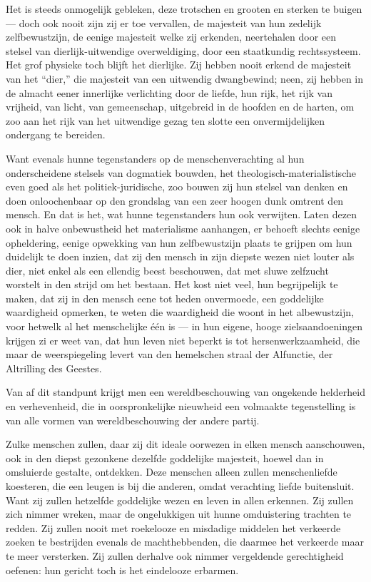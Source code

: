 \documentclass[a4paper, 12pt, oneside, dutch]{article}
\begin{document}
Het is steeds onmogelijk gebleken, deze trotschen en grooten en sterken te buigen --- doch ook nooit zijn zij er toe vervallen, de majesteit van hun zedelijk zelfbewustzijn, de eenige majesteit welke zij erkenden, neertehalen door een stelsel van dierlijk-uitwendige overweldiging, door een staatkundig rechtssysteem. Het grof physieke toch blijft het dierlijke. Zij hebben nooit erkend de majesteit van het "`dier,"' die majesteit van een uitwendig dwangbewind; neen, zij hebben in de almacht eener innerlijke verlichting door de liefde, hun rijk, het rijk van vrijheid, van licht, van gemeenschap, uitgebreid in de hoofden en de harten, om zoo aan het rijk van het uitwendige gezag ten slotte een onvermijdelijken ondergang te bereiden.

Want evenals hunne tegenstanders op de menschenverachting al hun onderscheidene stelsels van dogmatiek bouwden, het theologisch-materialistische even goed als het politiek-juridische, zoo bouwen zij hun stelsel van denken en doen onloochenbaar op den grondslag van een zeer hoogen dunk omtrent den mensch. En dat is het, wat hunne tegenstanders hun ook verwijten. Laten dezen ook in halve onbewustheid het materialisme aanhangen, er behoeft slechts eenige opheldering, eenige opwekking van hun zelfbewustzijn plaats te grijpen om hun duidelijk te doen inzien, dat zij den mensch in zijn diepste wezen niet louter als dier, niet enkel als een ellendig beest beschouwen, dat met sluwe zelfzucht worstelt in den strijd om het bestaan. Het kost niet veel, hun begrijpelijk te maken, dat zij in den mensch eene tot heden onvermoede, een goddelijke waardigheid opmerken, te weten die waardigheid die woont in het albewustzijn, voor hetwelk al het menschelijke één is --- in hun eigene, hooge zielsaandoeningen krijgen zi er weet van, dat hun leven niet beperkt is tot hersenwerkzaamheid, die maar de weerspiegeling levert van den hemelschen straal der Alfunctie, der Altrilling des Geestes.

Van af dit standpunt krijgt men een wereldbeschouwing van ongekende helderheid en verhevenheid, die in oorspronkelijke nieuwheid een volmaakte tegenstelling is van alle vormen van wereldbeschouwing der andere partij.

Zulke menschen zullen, daar zij dit ideale oorwezen in elken mensch aanschouwen, ook in den diepst gezonkene dezelfde goddelijke majesteit, hoewel dan in omsluierde gestalte, ontdekken. Deze menschen alleen zullen menschenliefde koesteren, die een leugen is bij die anderen, omdat verachting liefde buitensluit. Want zij zullen hetzelfde goddelijke wezen en leven in allen erkennen. Zij zullen zich nimmer wreken, maar de ongelukkigen uit hunne omduistering trachten te redden. Zij zullen nooit met roekelooze en misdadige middelen het verkeerde zoeken te bestrijden evenals de machthebbenden, die daarmee het verkeerde maar te meer versterken. Zij zullen derhalve ook nimmer vergeldende gerechtigheid oefenen: hun gericht toch is het eindelooze erbarmen.
\end{document}
